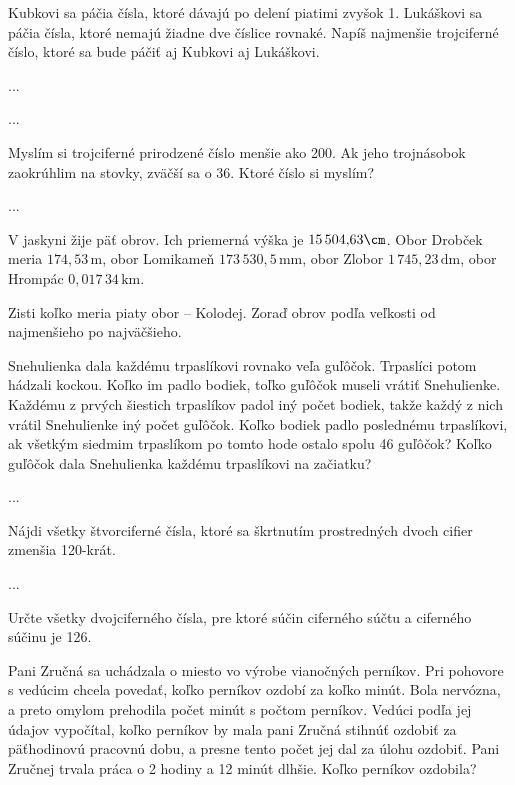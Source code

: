 {%
Kubkovi sa páčia čísla, ktoré dávajú po delení piatimi zvyšok 1. Lukáškovi sa páčia čísla, ktoré
nemajú žiadne dve číslice rovnaké. Napíš najmenšie trojciferné číslo, ktoré sa bude páčiť aj
Kubkovi aj Lukáškovi.}

{%
...}

{%
...}

{%
Myslím si trojciferné prirodzené číslo menšie ako 200. Ak jeho trojnásobok zaokrúhlim na stovky,
zväčší sa o 36. Ktoré číslo si myslím?}

{%
...}

{%
V jaskyni žije päť obrov. Ich priemerná výška je $15\,504{,}63\cm$. Obor Drobček meria $174{,}53\,\text{m}$, obor Lomikameň $173\,530{,}5\,\text{mm}$, obor Zlobor $1\,745{,}23\,\text{dm}$, obor Hrompác $0{,}017\,34\,\text{km}$.
\begin{itemize}
 Zisti koľko meria piaty obor -- Kolodej.
 Zoraď obrov podľa veľkosti od najmenšieho po najväčšieho.
\end{itemize}
}

{%
Snehulienka dala každému trpaslíkovi rovnako veľa guľôčok. Trpaslíci potom hádzali kockou. Koľko im padlo bodiek, toľko guľôčok museli vrátiť Snehulienke. Každému z prvých šiestich trpaslíkov padol iný počet bodiek, takže každý z nich vrátil Snehulienke iný počet guľôčok. Koľko bodiek padlo poslednému trpaslíkovi, ak všetkým siedmim trpaslíkom po tomto hode ostalo spolu 46 guľôčok? Koľko guľôčok dala Snehulienka každému trpaslíkovi na začiatku?}

{%
...}

{%
Nájdi všetky štvorciferné čísla, ktoré sa škrtnutím prostredných dvoch cifier zmenšia 120-krát.}

{%
...}

{%
Určte všetky dvojciferného čísla, pre ktoré súčin ciferného súčtu a ciferného súčinu je 126.}

{%
Pani Zručná sa uchádzala o miesto vo výrobe vianočných perníkov. Pri pohovore s vedúcim chcela povedať, koľko perníkov ozdobí za koľko minút. Bola nervózna, a preto omylom prehodila počet minút s počtom perníkov. Vedúci podľa jej údajov vypočítal, koľko perníkov by mala pani Zručná stihnúť ozdobiť za päťhodinovú pracovnú dobu, a presne tento počet jej dal za úlohu ozdobiť. Pani Zručnej trvala práca o 2 hodiny a 12 minút dlhšie. Koľko perníkov ozdobila?}

